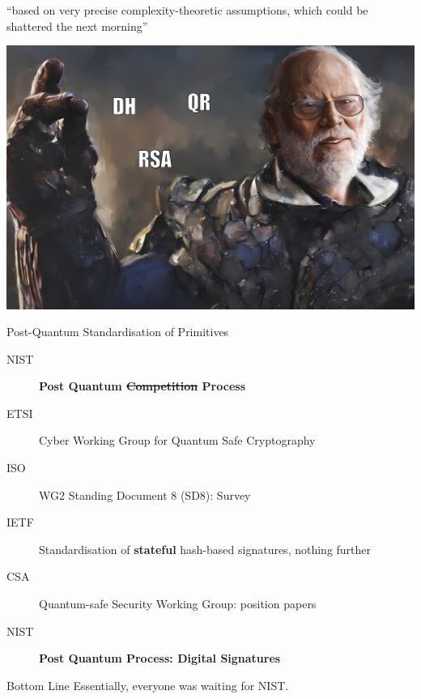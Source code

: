\documentclass[xcolor=table,10pt,aspectratio=169]{beamer}
\begin{document}
\begin{frame}[label={sec:orgb069ac3}]{``based on very precise complexity-theoretic assumptions, which could be shattered the next morning''}
\begin{center}
\includegraphics[keepaspectratio,height=.8\textheight]{./lecture-assumptions-shor.jpg}
\end{center}
\end{frame}
\begin{frame}[label={sec:org101bdff}]{Post-Quantum Standardisation of Primitives}
\begin{description}
\item[{NIST}] \textbf{Post Quantum \sout{Competition} Process}
\item[{ETSI}] Cyber Working Group for Quantum Safe Cryptography
\item[{ISO}] WG2 Standing Document 8 (SD8): Survey
\item[{IETF}] Standardisation of \textbf{stateful} hash-based signatures, nothing further
\item[{CSA}] Quantum-safe Security Working Group: position papers
\item[{NIST}] \textbf{Post Quantum Process: Digital Signatures}
\end{description}

\pause
\begin{alertblock}{Bottom Line}
Essentially, everyone was waiting for NIST.
\end{alertblock}
\vspace{0.7em}
\end{frame}
\end{document}
